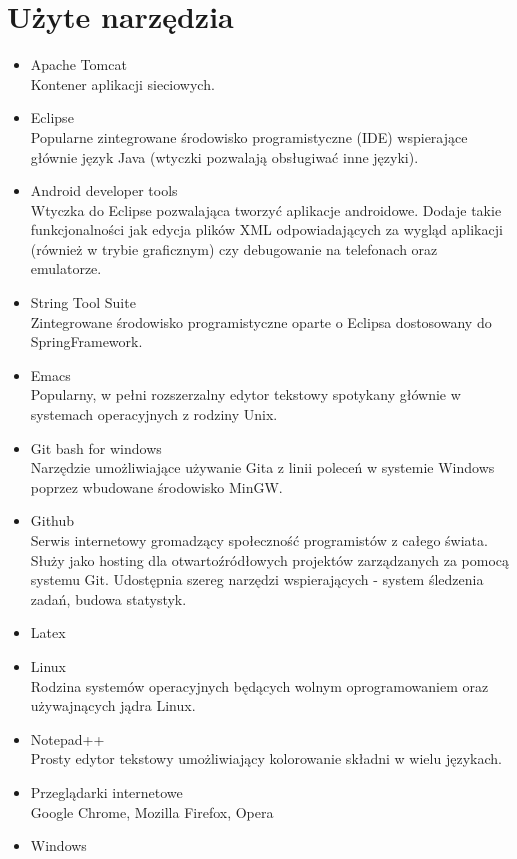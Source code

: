 \documentclass[11pt,a4paper,polish,thesis]{dcsbook}
\begin{document}
\section{Użyte narzędzia}
\begin{itemize}
\item{Apache Tomcat} \\
Kontener aplikacji sieciowych.
\item{Eclipse} \\
Popularne zintegrowane środowisko programistyczne (IDE) wspierające głównie język Java (wtyczki pozwalają obsługiwać inne języki). 
\item{Android developer tools} \\
Wtyczka do Eclipse pozwalająca tworzyć aplikacje androidowe. Dodaje takie funkcjonalności jak edycja plików XML odpowiadających za wygląd aplikacji (również w trybie graficznym) czy debugowanie na telefonach oraz emulatorze.
\item{String Tool Suite} \\
Zintegrowane środowisko programistyczne oparte o Eclipsa dostosowany do SpringFramework.
\item{Emacs} \\
Popularny, w pełni rozszerzalny edytor tekstowy spotykany głównie w systemach operacyjnych z rodziny Unix.
\item{Git bash for windows} \\
Narzędzie umożliwiające używanie Gita z linii poleceń w systemie Windows poprzez wbudowane środowisko MinGW.
\item{Github} \\
Serwis internetowy gromadzący społeczność programistów z całego świata. Służy jako hosting dla otwartoźródłowych projektów zarządzanych za pomocą systemu Git.
Udostępnia szereg narzędzi wspierających - system śledzenia zadań, budowa statystyk.
\item{Latex} \\
\item{Linux} \\
Rodzina systemów operacyjnych będących wolnym oprogramowaniem oraz używajnących jądra Linux.
\item{Notepad++} \\
Prosty edytor tekstowy umożliwiający kolorowanie składni w wielu językach.
\item{Przeglądarki internetowe} \\
Google Chrome, Mozilla Firefox, Opera
\item{Windows} \\
\end{itemize}
\end{document}
